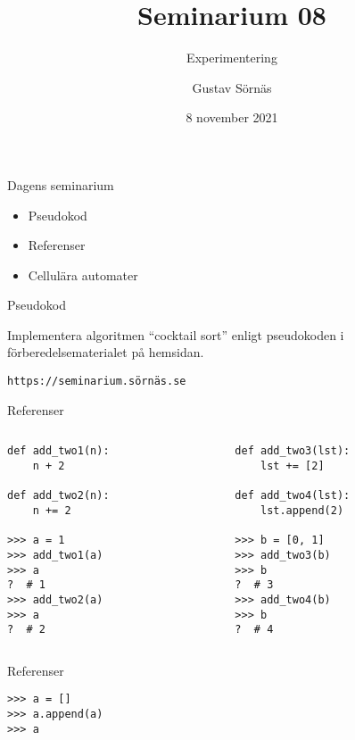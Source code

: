 \documentclass{beamer}
\title{Seminarium 08}
\subtitle{Experimentering}
\date{8 november 2021}
\author{Gustav Sörnäs}
\begin{document}
  \frame{\titlepage}

  \begin{frame}{Dagens seminarium}

    \begin{itemize}
      \item Pseudokod
      \item Referenser
      \item Cellulära automater
    \end{itemize}

  \end{frame}

  \begin{frame}[fragile]{Pseudokod}

    Implementera algoritmen ``cocktail sort'' enligt pseudokoden i
    förberedelsematerialet på hemsidan.

    \texttt{https://seminarium.sörnäs.se}

  \end{frame}

  \begin{frame}[fragile]{Referenser}

    \begin{columns}
      \begin{column}{0.48\textwidth}
        \begin{lstlisting}
def add_two1(n):
    n + 2

def add_two2(n):
    n += 2

>>> a = 1
>>> add_two1(a)
>>> a
?  # 1
>>> add_two2(a)
>>> a
?  # 2
        \end{lstlisting}
      \end{column}
      \begin{column}{0.48\textwidth}
        \begin{lstlisting}    
def add_two3(lst):
    lst += [2]

def add_two4(lst):
    lst.append(2)

>>> b = [0, 1]
>>> add_two3(b)
>>> b
?  # 3
>>> add_two4(b)
>>> b
?  # 4
        \end{lstlisting}
      \end{column}
    \end{columns}

  \end{frame}

  \begin{frame}[fragile]{Referenser}

    \begin{lstlisting}
>>> a = []
>>> a.append(a)
>>> a
    \end{lstlisting}

  \end{frame}
\end{document}
